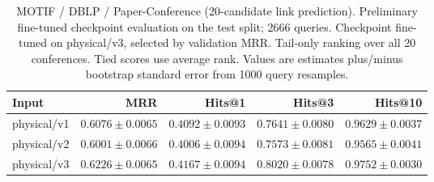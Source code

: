 \begin{table}[t]
\centering
\small
\begin{tabular}{lrrrr}
\toprule
Input & MRR & Hits@1 & Hits@3 & Hits@10 \\
\midrule
physical/v1 & $0.6076 \pm 0.0065$ & $0.4092 \pm 0.0093$ & $0.7641 \pm 0.0080$ & $0.9629 \pm 0.0037$ \\
physical/v2 & $0.6001 \pm 0.0066$ & $0.4006 \pm 0.0094$ & $0.7573 \pm 0.0081$ & $0.9565 \pm 0.0041$ \\
physical/v3 & $0.6226 \pm 0.0065$ & $0.4167 \pm 0.0094$ & $0.8020 \pm 0.0078$ & $0.9752 \pm 0.0030$ \\
\bottomrule
\end{tabular}
\caption{MOTIF / DBLP / Paper-Conference (20-candidate link prediction). Preliminary fine-tuned checkpoint evaluation on the test split; 2666 queries. Checkpoint fine-tuned on physical/v3, selected by validation MRR. Tail-only ranking over all 20 conferences. Tied scores use average rank. Values are estimates plus/minus bootstrap standard error from 1000 query resamples.}
\label{tab:motif-paper_conference-link_prediction}
\end{table}
